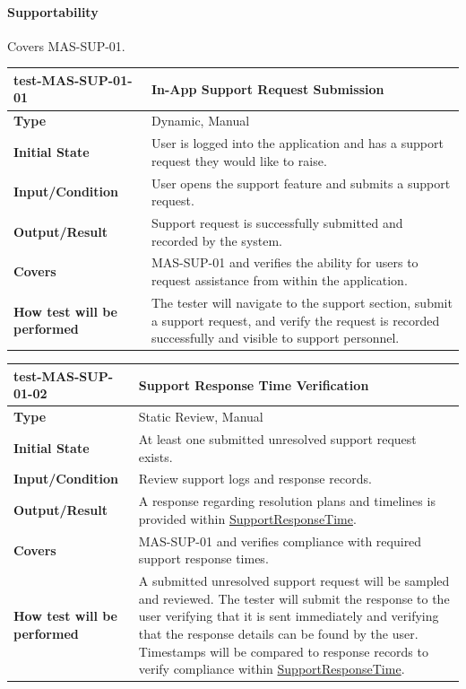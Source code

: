 \documentclass[12pt, titlepage]{article}
\newcommand{\const}[1]{\hyperlink{const:#1}{\textsf{#1}}}
\begin{document}
\paragraph{Supportability}

Covers MAS-SUP-01.

\noindent\begin{tabularx}{\textwidth}{>{\raggedright\arraybackslash}p{3.5cm}X}
  \toprule
  \textbf{test-MAS-SUP-01-01} & \textbf{In-App Support Request Submission}\\
  \midrule
  \textbf{Type} & Dynamic, Manual\\
  \textbf{Initial State} & User is logged into the application and has a support request they would like to raise.\\
  \textbf{Input/Condition} & User opens the support feature and submits a support request.\\
  \textbf{Output/Result} & Support request is successfully submitted and recorded by the system.\\
  \textbf{Covers} & MAS-SUP-01 and verifies the ability for users to request assistance from within the application.\\
  \textbf{How test will be performed} & The tester will navigate to the support section, submit a support request, and verify the request is recorded successfully and visible to support personnel.\\
  \bottomrule
\end{tabularx}

\vspace{1em}

\noindent\begin{tabularx}{\textwidth}{>{\raggedright\arraybackslash}p{3.5cm}X}
  \toprule
  \textbf{test-MAS-SUP-01-02} & \textbf{Support Response Time Verification}\\
  \midrule
  \textbf{Type} & Static Review, Manual\\
  \textbf{Initial State} & At least one submitted unresolved support request exists.\\
  \textbf{Input/Condition} & Review support logs and response records.\\
  \textbf{Output/Result} & A response regarding resolution plans and timelines is provided within \const{SupportResponseTime}.\\
  \textbf{Covers} & MAS-SUP-01 and verifies compliance with required support response times.\\
  \textbf{How test will be performed} & A submitted unresolved support request will be sampled and reviewed. The tester will submit the response to the user verifying that it is sent immediately and verifying that the response details can be found by the user. Timestamps will be compared to response records to verify compliance within \const{SupportResponseTime}.\\
  \bottomrule
\end{tabularx}
\end{document}
